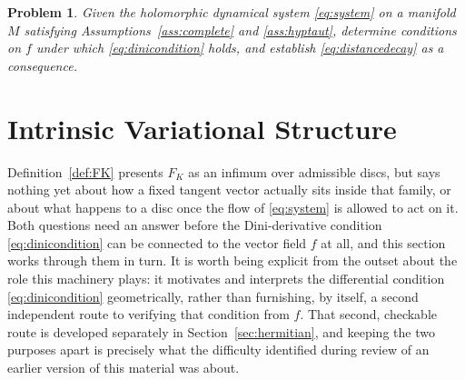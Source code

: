 \documentclass[preprint,12pt,authoryear]{elsarticle}
\newtheorem{problem}{Problem}
\begin{document}
\begin{problem}
\label{prob:main}
Given the holomorphic dynamical system \eqref{eq:system} on a manifold $M$ satisfying Assumptions~\ref{ass:complete} and \ref{ass:hyptaut}, determine conditions on $f$ under which \eqref{eq:dinicondition} holds, and establish \eqref{eq:distancedecay} as a consequence.
\end{problem}

%
%
%
%
%
%
%
%
%

\section{Intrinsic Variational Structure}
\label{sec:variational}

Definition~\ref{def:FK} presents $F_K$ as an infimum over admissible discs, but says nothing yet about how a fixed tangent vector actually sits inside that family, or about what happens to a disc once the flow of \eqref{eq:system} is allowed to act on it. Both questions need an answer before the Dini-derivative condition \eqref{eq:dinicondition} can be connected to the vector field $f$ at all, and this section works through them in turn. It is worth being explicit from the outset about the role this machinery plays: it motivates and interprets the differential condition \eqref{eq:dinicondition} geometrically, rather than furnishing, by itself, a second independent route to verifying that condition from $f$. That second, checkable route is developed separately in Section~\ref{sec:hermitian}, and keeping the two purposes apart is precisely what the difficulty identified during review of an earlier version of this material was about.
\end{document}
